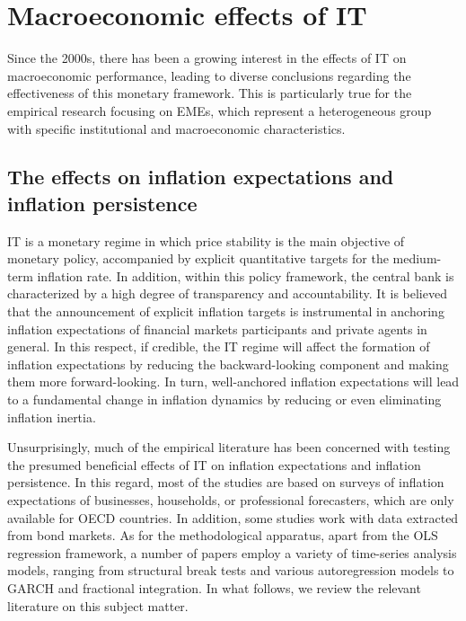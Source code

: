 \documentclass{article}
\begin{document}
\section{Macroeconomic effects of IT}

Since the 2000s, there has been a growing interest in the effects of IT on macroeconomic performance, leading to diverse conclusions regarding the effectiveness of this monetary framework. This is particularly true for the empirical research focusing on EMEs, which represent a heterogeneous group with specific institutional and macroeconomic characteristics.

\subsection{The effects on inflation expectations and inflation persistence}

IT is a monetary regime in which price stability is the main objective of monetary policy, accompanied by explicit quantitative targets for the medium-term inflation rate. In addition, within this policy framework, the central bank is characterized by a high degree of transparency and accountability. It is believed that the announcement of explicit inflation targets is instrumental in anchoring inflation expectations of financial markets participants and private agents in general. In this respect, if credible, the IT regime will affect the formation of inflation expectations by reducing the backward-looking component and making them more forward-looking. In turn, well-anchored inflation expectations will lead to a fundamental change in inflation dynamics by reducing or even eliminating inflation inertia.

Unsurprisingly, much of the empirical literature has been concerned with testing the presumed beneficial effects of IT on inflation expectations and inflation persistence. In this regard, most of the studies are based on surveys of inflation expectations of businesses, households, or professional forecasters, which are only available for OECD countries. In addition, some studies work with data extracted from bond markets. As for the methodological apparatus, apart from the OLS regression framework, a number of papers employ a variety of time-series analysis models, ranging from structural break tests and various autoregression models to GARCH and fractional integration. In what follows, we review the relevant literature on this subject matter.
\end{document}
